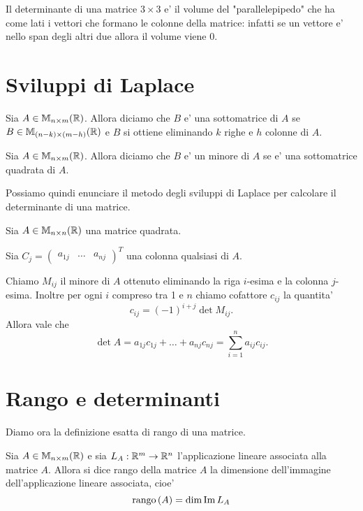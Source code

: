 Il determinante di una matrice $3 \times 3$ e' il volume del "parallelepipedo" che ha come lati i vettori che formano le colonne della matrice: infatti se un vettore e' nello span degli altri due allora il volume viene 0.

\section{Sviluppi di Laplace}

\begin{definition}
    Sia $A \in \mathbb{M}_{n\times m}(\mathbb{R})$. Allora diciamo che $B$ e' una sottomatrice di $A$ se $B \in \mathbb{M}_{(n-k) \times (m-h)}(\mathbb{R})$ e $B$ si ottiene eliminando $k$ righe e $h$ colonne di $A$.
\end{definition}

\begin{definition}
    Sia $A \in \mathbb{M}_{n\times m}(\mathbb{R})$. Allora diciamo che $B$ e' un minore di $A$ se e' una sottomatrice quadrata di $A$.
\end{definition}

Possiamo quindi enunciare il metodo degli sviluppi di Laplace per calcolare il determinante di una matrice.

\begin{theorem}
    Sia $A \in \mathbb{M}_{n \times n}(\mathbb{R})$ una matrice quadrata. 
    
    Sia $C_j = \begin{pmatrix}
        a_{1j} & \dots & a_{nj}
    \end{pmatrix}^T$ una colonna qualsiasi di $A$. 
    
    Chiamo $M_{ij}$ il minore di $A$ ottenuto eliminando la riga $i$-esima e la colonna $j$-esima. Inoltre per ogni $i$ compreso tra 1 e $n$ chiamo cofattore $c_{ij}$ la quantita' \[
        c_{ij} = (-1)^{i+j} \det M_{ij}.
    \]
    Allora vale che \begin{equation}
        \det A = a_{1j}c_{1j} + \dots + a_{nj}c_{nj} = \sum_{i = 1}^n a_{ij}c_{ij}.
    \end{equation}
\end{theorem}

\section{Rango e determinanti}

Diamo ora la definizione esatta di rango di una matrice.

\begin{definition}
    Sia $A \in \mathbb{M}_{n \times m}(\mathbb{R})$ e sia $L_A : \mathbb{R}^m \to \mathbb{R}^n$ l'applicazione lineare associata alla matrice $A$. Allora si dice rango della matrice $A$ la dimensione dell'immagine dell'applicazione lineare associata, cioe'
    \begin{equation}
        \operatorname{rango}\left( A \right) = \dim \operatorname{Im}L_A
    \end{equation}
\end{definition}

